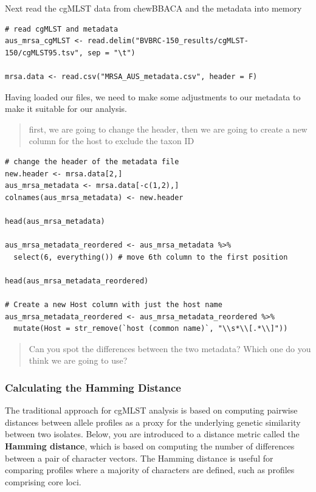 \documentclass[
]{book}
\begin{document}
Next read the cgMLST data from chewBBACA and the metadata into memory

\begin{verbatim}
# read cgMLST and metadata
aus_mrsa_cgMLST <- read.delim("BVBRC-150_results/cgMLST-150/cgMLST95.tsv", sep = "\t")

mrsa.data <- read.csv("MRSA_AUS_metadata.csv", header = F)
\end{verbatim}

Having loaded our files, we need to make some adjustments to our metadata to make it suitable for our analysis.

\begin{quote}
first, we are going to change the header,
then we are going to create a new column for the host to exclude the taxon ID
\end{quote}

\begin{verbatim}
# change the header of the metadata file
new.header <- mrsa.data[2,]
aus_mrsa_metadata <- mrsa.data[-c(1,2),]
colnames(aus_mrsa_metadata) <- new.header

head(aus_mrsa_metadata)

aus_mrsa_metadata_reordered <- aus_mrsa_metadata %>% 
  select(6, everything()) # move 6th column to the first position

head(aus_mrsa_metadata_reordered)

# Create a new Host column with just the host name
aus_mrsa_metadata_reordered <- aus_mrsa_metadata_reordered %>%
  mutate(Host = str_remove(`host (common name)`, "\\s*\\[.*\\]"))
\end{verbatim}

\begin{quote}
Can you spot the differences between the two metadata? Which one do you think we are going to use?
\end{quote}

\subsubsection{Calculating the Hamming Distance}\label{calculating-the-hamming-distance}

The traditional approach for cgMLST analysis is based on computing pairwise distances between allele profiles as a proxy for the underlying genetic similarity between two isolates. Below, you are introduced to a distance metric called the \textbf{Hamming distance}, which is based on computing the number of differences between a pair of character vectors. The Hamming distance is useful for comparing profiles where a majority of characters are defined, such as profiles comprising core loci.
\end{document}
